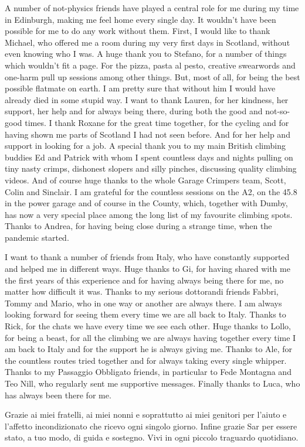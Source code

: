 A number of not-physics friends have played a central role for me during my time in Edinburgh,
making me feel home every single day. It wouldn't have been possible for me to do any work without them.
First, I would like to thank Michael, who offered me a room during my very first days in Scotland, without even knowing 
who I was.
% 
A huge thank you to Stefano, for a number of things which wouldn't fit a page. For the pizza, pasta al pesto,
creative swearwords and one-harm pull up sessions among other things. 
But, most of all, for being the best possible flatmate on earth.
I am pretty sure that without him I would have already died in some stupid way. 
%
I want to thank Lauren, for her kindness, her support, her help and for always being there, during
both the good and not-so-good times.  
I thank Roxane for the great time together, for the cycling and for having shown me parts of Scotland 
I had not seen before. And for her help and support in looking for a job. 
%
A special thank you to my main British climbing buddies Ed and Patrick with whom I spent countless days and nights
pulling on tiny nasty crimps, dishonest slopers and silly pinches, discussing quality climbing videos.
And of course huge thanks to the whole Garage Crimpers team,
Scott, Colin and Sinclair. I am grateful for the countless sessions on the A2, on the 45.8 in the power garage 
and of course in the County, which, together with Dumby, has now a very special place among the long list of my
favourite climbing spots. 
%
Thanks to Andrea, for having being close during a strange time, when the pandemic started.

%   
I want to thank a number of friends from Italy, who have constantly supported and helped me in different ways.
Huge thanks to Gi, for having shared with me the first years of this experience and for having always being there for me,
no matter how difficult it was.
Thanks to my serious dottorandi friends Fabbri, Tommy and Mario, who in one way or another are always there.
I am always looking forward for seeing them every time we are all back to Italy.
Thanks to Rick, for the chats we have every time we see each other.
Huge thanks to Lollo, for being a beast, for all the climbing we are always having together every time
I am back to Italy and for the support he is always giving me.
Thanks to Ale, for the countless routes tried together and for always taking every single whipper.
Thanks to my Passaggio Obbligato friends, in particular to Fede Montagna and Teo Nill, who 
regularly sent me supportive messages. 
Finally thanks to Luca, who has always been there for me.

Grazie ai miei fratelli, ai miei nonni e soprattutto ai miei genitori per l'aiuto e l'affetto incondizionato
che ricevo ogni singolo giorno. 
Infine grazie Sar per essere stato, a tuo modo, di guida e sostegno. Vivi in ogni piccolo traguardo quotidiano.

\blankpage
 



